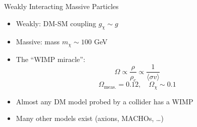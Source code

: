 \documentclass[aspectratio=169,xcolor=dvipsnames,,table,compress]{beamer}
\begin{document}
\begin{frame}
\begin{columns}[T]
\begin{column}{0.5\textwidth}
\begin{center}
        {Weakly Interacting Massive Particles}
      \end{center}
      \begin{itemize}
        \item Weakly: DM-SM coupling $g_\chi \sim g$ 
        \item Massive: mass $m_\chi \sim 100$ GeV
        \item The ``WIMP miracle'':
          \[\Omega \propto  \frac{\rho}{\rho_{c}} \propto \frac{1}{\langle \sigma v \rangle} \]
          \[\Omega_\mathrm{meas.} = 0.12, \quad \Omega_\chi \sim 0.1\]
        \item Almost any DM model probed by a collider has a WIMP 
        \item Many other models exist (axions, MACHOs, \dots)
      \end{itemize}
    \end{column}
  \end{columns}
\end{frame}
\end{document}
